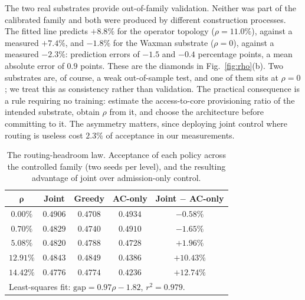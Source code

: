 \documentclass[10pt,journal,comsoc]{IEEEtran}
\begin{document}
The two real substrates provide out-of-family validation. Neither was part
of the calibrated family and both were produced by different construction
processes. The fitted line predicts $+8.8\%$ for the operator topology
($\rho=11.0\%$), against a measured $+7.4\%$, and $-1.8\%$ for the Waxman
substrate ($\rho=0$), against a measured $-2.3\%$: prediction errors of
$-1.5$ and $-0.4$ percentage points, a mean absolute error of $0.9$
points. These are the diamonds in Fig.~\ref{fig:rho}(b). Two substrates
are, of course, a weak out-of-sample test, and one of them sits at
$\rho=0$; we treat this as consistency rather than validation. The practical consequence is a rule requiring no
training: estimate the access-to-core provisioning ratio of the intended
substrate, obtain $\rho$ from it, and choose the architecture before
committing to it. The asymmetry matters, since deploying joint control
where routing is useless cost $2.3\%$ of acceptance in our measurements.

\begin{table}[t]
\centering
\caption{The routing-headroom law. Acceptance of each policy across the
controlled family (two seeds per level), and the resulting advantage of
joint over admission-only control.}
\label{tab:law}
\renewcommand{\arraystretch}{1.2}
\begin{tabular}{ccccc}
\toprule
$\boldsymbol{\rho}$ & \textbf{Joint} & \textbf{Greedy} & \textbf{AC-only} & \textbf{Joint $-$ AC-only} \\
\midrule
$0.00\%$  & $0.4906$ & $0.4708$ & $0.4934$ & $-0.58\%$ \\
$0.70\%$  & $0.4829$ & $0.4740$ & $0.4910$ & $-1.65\%$ \\
$5.08\%$  & $0.4820$ & $0.4788$ & $0.4728$ & $+1.96\%$ \\
$12.91\%$ & $0.4843$ & $0.4849$ & $0.4386$ & $+10.43\%$ \\
$14.42\%$ & $0.4776$ & $0.4774$ & $0.4236$ & $+12.74\%$ \\
\midrule
\multicolumn{5}{l}{\footnotesize Least-squares fit: $\text{gap} = 0.97\rho - 1.82$, $r^2 = 0.979$.} \\
\bottomrule
\end{tabular}
\end{table}
\end{document}
